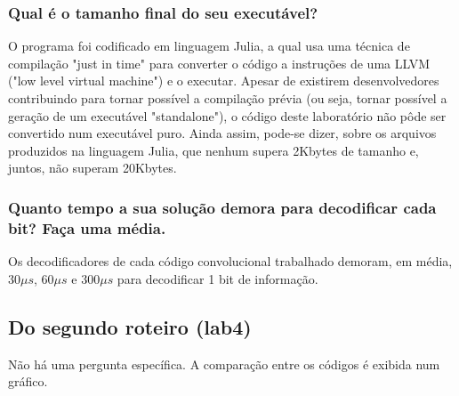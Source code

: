 \subsubsection{Qual é o tamanho final do seu executável?}

O programa foi codificado em linguagem Julia, a qual usa uma técnica de compilação "just in time" para converter o código a instruções de uma LLVM ("low level virtual machine") e o executar. Apesar de existirem desenvolvedores contribuindo para tornar possível a compilação prévia (ou seja, tornar possível a geração de um executável "standalone"), o código deste laboratório não pôde ser convertido num executável puro. Ainda assim, pode-se dizer, sobre os arquivos produzidos na linguagem Julia, que nenhum supera 2Kbytes de tamanho e, juntos, não superam 20Kbytes.

\subsubsection{Quanto tempo a sua solução demora para decodificar cada bit? Faça uma média.}

Os decodificadores de cada código convolucional trabalhado demoram, em média, $30 \mu s$, $60 \mu s$ e $300 \mu s$ para decodificar 1 bit de informação.

\subsection{Do segundo roteiro (lab4)}

Não há uma pergunta específica. A comparação entre os códigos é exibida num gráfico.
